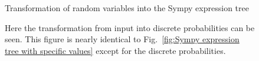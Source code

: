     \begin{figure}[H]
        
        \caption{Transformation of random variables into the Sympy expression tree}
        \caption*{Here the transformation from input into discrete probabilities can be seen. This figure is nearly identical to Fig.~\ref{fig:Sympy expression tree with specific values}
        except for the discrete probabilities.}
        \label{fig:Probability for two random variables using discrete probabilitites}
    \end{figure}

